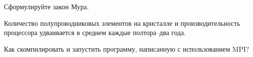 \documentclass[a4paper, 12pt, addpoints]{exam}
\begin{document}
\begin{questions}
\question[3] Сформулируйте закон Мура.
\begin{solution}[2cm]
Количество полупроводниковых элементов на кристалле и
производительность процессора удваивается в среднем каждые
полтора–два года.
\end{solution}

\question[3] Как скомпилировать и запустить программу, написанную с использованием MPI?
\begin{solution}[2cm]
\end{solution}


\end{questions}
\end{document}
